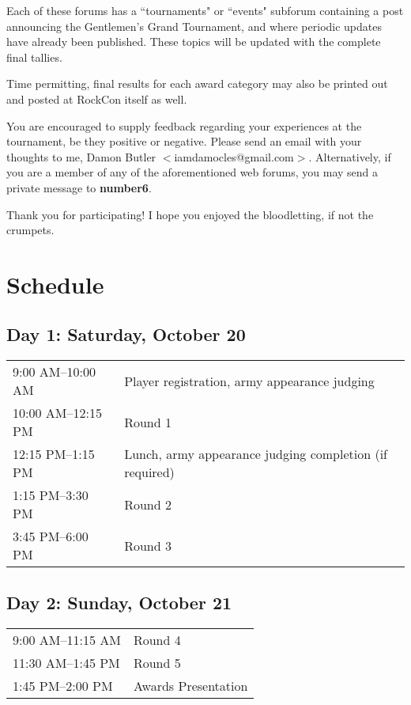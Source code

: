 \documentclass[10pt,titlepage]{article}
\begin{document}
Each of these forums has a ``tournaments" or ``events" subforum containing a post announcing the Gentlemen's Grand Tournament, and where periodic updates have already been published. These topics will be updated with the complete final tallies.

Time permitting, final results for each award category may also be printed out and posted at RockCon itself as well.

You are encouraged to supply feedback regarding your experiences at the tournament, be they positive or negative. Please send an email with your thoughts to me, Damon Butler $<$iamdamocles@gmail.com$>$. Alternatively, if you are a member of any of the aforementioned web forums, you may send a private message to \textbf{number6}.

Thank you for participating! I hope you enjoyed the bloodletting, if not the crumpets.

\section*{Schedule}

\subsection*{Day 1: Saturday, October 20}

\begin{tabular}[t]{@{}l@{\quad}l@{}}
\phantom{1}9:00 AM--10:00 AM & Player registration, army appearance judging \\
10:00 AM--12:15 PM & Round 1 \\
12:15 PM--\phantom{1}1:15 PM & Lunch, army appearance judging completion (if required) \\
\phantom{1}1:15 PM--\phantom{1}3:30 PM & Round 2 \\
\phantom{1}3:45 PM--\phantom{1}6:00 PM &  Round 3 \\
\end{tabular}

\subsection*{Day 2: Sunday, October 21}

\begin{tabular}[t]{@{}l@{\quad}l@{}}
\phantom{1}9:00 AM--11:15 AM & Round 4 \\
11:30 AM--\phantom{1}1:45 PM & Round 5 \\
\phantom{1}1:45 PM--\phantom{1}2:00 PM & Awards Presentation \\
\end{tabular}
\end{document}
